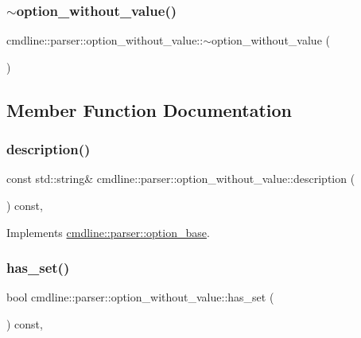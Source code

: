 \subsubsection{\texorpdfstring{$\sim$option\_without\_value()}{~option\_without\_value()}}
{\footnotesize\ttfamily cmdline\+::parser\+::option\+\_\+without\+\_\+value\+::$\sim$option\+\_\+without\+\_\+value (\begin{DoxyParamCaption}{ }\end{DoxyParamCaption})\hspace{0.3cm}{\ttfamily [inline]}}



\subsection{Member Function Documentation}
\mbox{\label{classcmdline_1_1parser_1_1option__without__value_ad6912e60b2dc1157ba982d882292ab28}} 
\subsubsection{\texorpdfstring{description()}{description()}}
{\footnotesize\ttfamily const std\+::string\& cmdline\+::parser\+::option\+\_\+without\+\_\+value\+::description (\begin{DoxyParamCaption}{ }\end{DoxyParamCaption}) const\hspace{0.3cm}{\ttfamily [inline]}, {\ttfamily [virtual]}}



Implements \mbox{\hyperlink{classcmdline_1_1parser_1_1option__base_adf2d7c92405305411ab6bc0d0b860d61}{cmdline\+::parser\+::option\+\_\+base}}.

\mbox{\label{classcmdline_1_1parser_1_1option__without__value_aa56f159aff4c9cd7bde01294077724e8}} 
\subsubsection{\texorpdfstring{has\_set()}{has\_set()}}
{\footnotesize\ttfamily bool cmdline\+::parser\+::option\+\_\+without\+\_\+value\+::has\+\_\+set (\begin{DoxyParamCaption}{ }\end{DoxyParamCaption}) const\hspace{0.3cm}{\ttfamily [inline]}, {\ttfamily [virtual]}}



